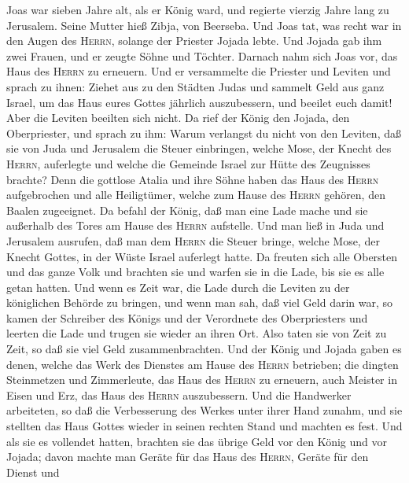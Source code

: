  Joas war sieben Jahre alt, als er König ward, und
regierte vierzig Jahre lang zu Jerusalem. Seine Mutter hieß Zibja, von
Beerseba.  Und Joas tat, was recht war in den Augen des
\textsc{Herrn}, solange der Priester Jojada lebte.  Und
Jojada gab ihm zwei Frauen, und er zeugte Söhne und Töchter.
 Darnach nahm sich Joas vor, das Haus des \textsc{Herrn}
zu erneuern.  Und er versammelte die Priester und Leviten
und sprach zu ihnen: Ziehet aus zu den Städten Judas und sammelt Geld
aus ganz Israel, um das Haus eures Gottes jährlich auszubessern, und
beeilet euch damit! Aber die Leviten beeilten sich nicht. 
Da rief der König den Jojada, den Oberpriester, und sprach zu ihm: Warum
verlangst du nicht von den Leviten, daß sie von Juda und Jerusalem die
Steuer einbringen, welche Mose, der Knecht des \textsc{Herrn},
auferlegte und welche die Gemeinde Israel zur Hütte des Zeugnisses
brachte?  Denn die gottlose Atalia und ihre Söhne haben
das Haus des \textsc{Herrn} aufgebrochen und alle Heiligtümer, welche
zum Hause des \textsc{Herrn} gehören, den Baalen zugeeignet.
 Da befahl der König, daß man eine Lade mache und sie
außerhalb des Tores am Hause des \textsc{Herrn} aufstelle.
 Und man ließ in Juda und Jerusalem ausrufen, daß man dem
\textsc{Herrn} die Steuer bringe, welche Mose, der Knecht Gottes, in der
Wüste Israel auferlegt hatte.  Da freuten sich alle
Obersten und das ganze Volk und brachten sie und warfen sie in die Lade,
bis sie es alle getan hatten.  Und wenn es Zeit war, die
Lade durch die Leviten zu der königlichen Behörde zu bringen, und wenn
man sah, daß viel Geld darin war, so kamen der Schreiber des Königs und
der Verordnete des Oberpriesters und leerten die Lade und trugen sie
wieder an ihren Ort. Also taten sie von Zeit zu Zeit, so daß sie viel
Geld zusammenbrachten.  Und der König und Jojada gaben es
denen, welche das Werk des Dienstes am Hause des \textsc{Herrn}
betrieben; die dingten Steinmetzen und Zimmerleute, das Haus des
\textsc{Herrn} zu erneuern, auch Meister in Eisen und Erz, das Haus des
\textsc{Herrn} auszubessern.  Und die Handwerker
arbeiteten, so daß die Verbesserung des Werkes unter ihrer Hand zunahm,
und sie stellten das Haus Gottes wieder in seinen rechten Stand und
machten es fest.  Und als sie es vollendet hatten,
brachten sie das übrige Geld vor den König und vor Jojada; davon machte
man Geräte für das Haus des \textsc{Herrn}, Geräte für den Dienst und
